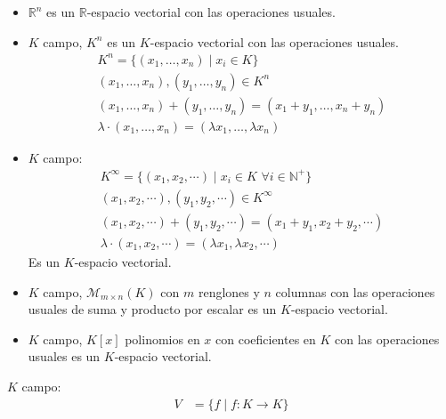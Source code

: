 \begin{example}{}{}
    \begin{itemize}
        \item $\mathbb{R}^n$ es un $\mathbb{R}$-espacio vectorial con las operaciones usuales.
        \item $K$ campo, $K^n$ es un $K$-espacio vectorial con las operaciones usuales.
        \begin{align*}
            K^n = \{(x_1,\dots,x_n) \mid x_i \in K\} \\
            (x_1,\dots,x_n), (y_1,\dots,y_n) \in K^n \\
            (x_1,\dots,x_n) + (y_1,\dots,y_n) = (x_1+y_1,\dots,x_n+y_n) \\
            \lambda \cdot (x_1,\dots,x_n) = (\lambda x_1,\dots,\lambda x_n)
        \end{align*}

        \item $K$ campo:
        \begin{align*}
            K^{\infty} = \{(x_1, x_2, \cdots) \mid x_i \in K \, \, \forall i \in \mathbb{N}^{+}\} \\
            (x_1, x_2, \cdots), (y_1, y_2, \cdots) \in K^{\infty} \\
            (x_1, x_2, \cdots) + (y_1, y_2, \cdots) = (x_1+y_1, x_2+y_2, \cdots) \\
            \lambda \cdot (x_1, x_2, \cdots) = (\lambda x_1, \lambda x_2, \cdots)
        \end{align*} 
        Es un $K$-espacio vectorial.

        \item $K$ campo, $\mathcal{M}_{m\times n}(K)$ con $m$ renglones y $n$ columnas con las operaciones usuales de suma y producto por escalar es un $K$-espacio vectorial.

        \item $K$ campo, $K[x]$ polinomios en $x$ con coeficientes en $K$ con las operaciones usuales es un $K$-espacio vectorial.
    \end{itemize}

\end{example}

\begin{example}{}{}
    $K$ campo:
    \begin{align*}
        V &= \{f \mid f: K \rightarrow K\} \\
    \end{align*}

\end{example}

